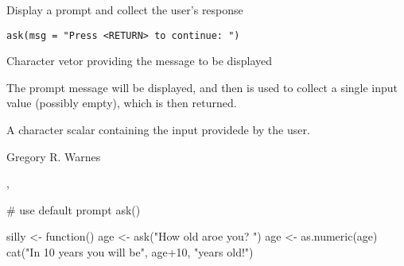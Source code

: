 \begin{Description}\relax
Display a prompt and collect the user's response
\end{Description}
\begin{Usage}
\begin{verbatim}
ask(msg = "Press <RETURN> to continue: ")
\end{verbatim}
\end{Usage}
\begin{Arguments}
\begin{ldescription}
\item[\code{msg}] Character vetor providing the message to be displayed
\end{ldescription}
\end{Arguments}
\begin{Details}\relax
The prompt message will be displayed, and then  is
used to collect a single input value (possibly empty), which is then
returned.
\end{Details}
\begin{Value}
A character scalar containing the input providede by the user.
\end{Value}
\begin{Author}\relax
Gregory R. Warnes 
\end{Author}
\begin{SeeAlso}\relax
{}, 
\end{SeeAlso}
\begin{Examples}
\begin{ExampleCode}

# use default prompt
ask()

silly <- function()
{
   age <- ask("How old aroe you? ")
   age <- as.numeric(age)
   cat("In 10 years you will be", age+10, "years old!\n")
}
   
\end{ExampleCode}
\end{Examples}

